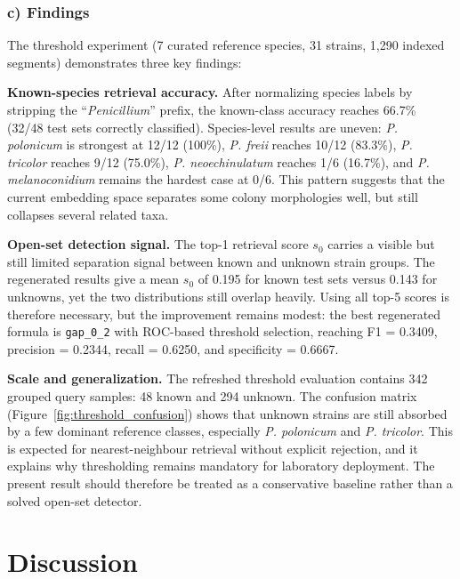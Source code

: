 

\subsubsection{c) Findings}

The threshold experiment (7 curated reference species, 31 strains, 1,290 indexed segments) demonstrates three key findings:

\textbf{Known-species retrieval accuracy.} After normalizing species labels by stripping the ``\emph{Penicillium}'' prefix, the known-class accuracy reaches 66.7\% (32/48 test sets correctly classified). Species-level results are uneven: \emph{P. polonicum} is strongest at 12/12 (100\%), \emph{P. freii} reaches 10/12 (83.3\%), \emph{P. tricolor} reaches 9/12 (75.0\%), \emph{P. neoechinulatum} reaches 1/6 (16.7\%), and \emph{P. melanoconidium} remains the hardest case at 0/6. This pattern suggests that the current embedding space separates some colony morphologies well, but still collapses several related taxa.

\textbf{Open-set detection signal.} The top-1 retrieval score $s_0$ carries a visible but still limited separation signal between known and unknown strain groups. The regenerated results give a mean $s_0$ of 0.195 for known test sets versus 0.143 for unknowns, yet the two distributions still overlap heavily. Using all top-5 scores is therefore necessary, but the improvement remains modest: the best regenerated formula is \texttt{gap\_0\_2} with ROC-based threshold selection, reaching F1 = 0.3409, precision = 0.2344, recall = 0.6250, and specificity = 0.6667.

\textbf{Scale and generalization.} The refreshed threshold evaluation contains 342 grouped query samples: 48 known and 294 unknown. The confusion matrix (Figure~\ref{fig:threshold_confusion}) shows that unknown strains are still absorbed by a few dominant reference classes, especially \emph{P. polonicum} and \emph{P. tricolor}. This is expected for nearest-neighbour retrieval without explicit rejection, and it explains why thresholding remains mandatory for laboratory deployment. The present result should therefore be treated as a conservative baseline rather than a solved open-set detector.

\section{Discussion}\label{discussion}

